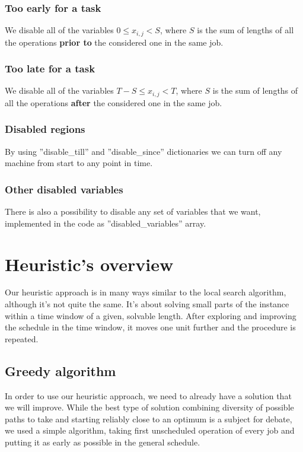 \documentclass[letterpaper, 11pt]{article}
\begin{document}
\begin{multicols}{2}
\subsubsection{Too early for a task}
We disable all of the variables $0 \leq x_{i,j} < S$, where $S$ is the sum
of lengths of all the operations \textbf{prior to} the considered one in the same job.
\subsubsection{Too late for a task}
\label{subsec:toolate}
We disable all of the variables $T-S \leq x_{i,j} < T$, where $S$ is the sum 
of lengths of all the operations \textbf{after} the considered one in the same job.
\subsubsection{Disabled regions}
\label{disabled_regions}
By using ''disable\_till'' and ''disable\_since'' dictionaries we can turn
off any machine from start to any point in time.
\subsubsection{Other disabled variables}
\label{disabled_variables}
There is also a possibility to disable any set of variables that we want,
implemented in the code as ''disabled\_variables'' array.


\section{Heuristic's overview}
Our heuristic approach is in many ways similar to the local search algorithm,
although it's not quite the same. It's about solving small parts of the 
instance within a time window of a given, solvable length. After exploring 
and improving the schedule in the time window, it moves one unit further and
the procedure is repeated.

\subsection{Greedy algorithm}
In order to use our heuristic approach, we need to already have a solution
that we will improve. While the best type of solution combining
diversity of possible paths to take and starting 
reliably close to an optimum is a subject for debate, we used a simple
algorithm, taking first unscheduled operation of every job and putting it as
early as possible in the general schedule.


\end{multicols}
\end{document}
